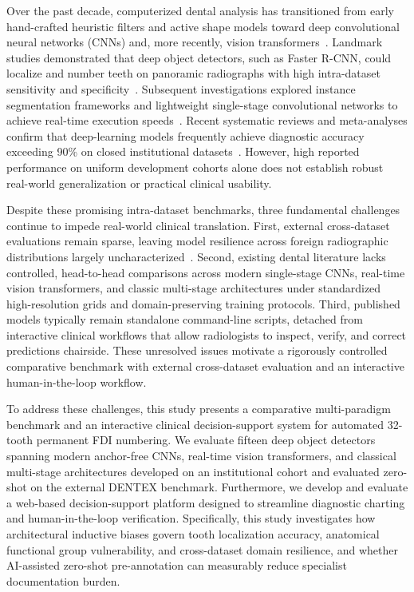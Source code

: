 \documentclass[10pt,journal,compsoc]{IEEEtran}
\begin{document}
Over the past decade, computerized dental analysis has transitioned from early hand-crafted heuristic filters and active shape models toward deep convolutional neural networks (CNNs) and, more recently, vision transformers~\cite{schwendicke2019,maganur2024}. Landmark studies demonstrated that deep object detectors, such as Faster R-CNN, could localize and number teeth on panoramic radiographs with high intra-dataset sensitivity and specificity~\cite{tuzoff2019,chen2019}. Subsequent investigations explored instance segmentation frameworks and lightweight single-stage convolutional networks to achieve real-time execution speeds~\cite{silva2020,jader2018,sadr2024}. Recent systematic reviews and meta-analyses confirm that deep-learning models frequently achieve diagnostic accuracy exceeding 90\% on closed institutional datasets~\cite{maganur2024,sadr2024}. However, high reported performance on uniform development cohorts alone does not establish robust real-world generalization or practical clinical usability.

Despite these promising intra-dataset benchmarks, three fundamental challenges continue to impede real-world clinical translation. First, external cross-dataset evaluations remain sparse, leaving model resilience across foreign radiographic distributions largely uncharacterized~\cite{maganur2024,dentex2023}. Second, existing dental literature lacks controlled, head-to-head comparisons across modern single-stage CNNs, real-time vision transformers, and classic multi-stage architectures under standardized high-resolution grids and domain-preserving training protocols. Third, published models typically remain standalone command-line scripts, detached from interactive clinical workflows that allow radiologists to inspect, verify, and correct predictions chairside. These unresolved issues motivate a rigorously controlled comparative benchmark with external cross-dataset evaluation and an interactive human-in-the-loop workflow.

To address these challenges, this study presents a comparative multi-paradigm benchmark and an interactive clinical decision-support system for automated 32-tooth permanent FDI numbering. We evaluate fifteen deep object detectors spanning modern anchor-free CNNs, real-time vision transformers, and classical multi-stage architectures developed on an institutional cohort and evaluated zero-shot on the external DENTEX benchmark. Furthermore, we develop and evaluate a web-based decision-support platform designed to streamline diagnostic charting and human-in-the-loop verification. Specifically, this study investigates how architectural inductive biases govern tooth localization accuracy, anatomical functional group vulnerability, and cross-dataset domain resilience, and whether AI-assisted zero-shot pre-annotation can measurably reduce specialist documentation burden.
\end{document}
